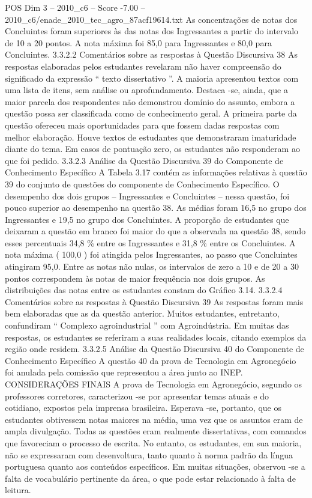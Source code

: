 \begin{textsample}{POS Dim 3 – 2010\_c6 – Score -7.00 – 2010\_c6/enade\_2010\_tec\_agro\_87acf19614.txt}
As concentrações de notas dos Concluintes foram superiores às das notas dos Ingressantes a partir do intervalo de 10 a 20 pontos.
A nota máxima foi 85,0 para Ingressantes e 80,0 para Concluintes. 3.3.2.2 Comentários sobre as respostas à Questão Discursiva 38 As respostas elaboradas pelos estudantes revelaram não haver compreensão do significado da expressão “ texto dissertativo ”.
A maioria apresentou textos com uma lista de itens, sem análise ou aprofundamento.
Destaca -se, ainda, que a maior parcela dos respondentes não demonstrou domínio do assunto, embora a questão possa ser classificada como de conhecimento geral.
A primeira parte da questão ofereceu mais oportunidades para que fossem dadas respostas com melhor elaboração.
Houve textos de estudantes que demonstraram imaturidade diante do tema.
Em casos de pontuação zero, os estudantes não responderam ao que foi pedido. 3.3.2.3 Análise da Questão Discursiva 39 do Componente de Conhecimento Específico A Tabela 3.17 contém as informações relativas à questão 39 do conjunto de questões do componente de Conhecimento Específico.
O desempenho dos dois grupos – Ingressantes e Concluintes – nessa questão, foi pouco superior ao desempenho na questão 38.
As médias foram 16,5 no grupo dos Ingressantes e 19,5 no grupo dos Concluintes.
A proporção de estudantes que deixaram a questão em branco foi maior do que a observada na questão 38, sendo esses percentuais 34,8 \% entre os Ingressantes e 31,8 \% entre os Concluintes.
A nota máxima ( 100,0 ) foi atingida pelos Ingressantes, ao passo que Concluintes atingiram 95,0.
Entre as notas não nulas, os intervalos de zero a 10 e de 20 a 30 pontos correspondem às notas de maior frequência nos dois grupos.
As distribuições das notas entre os estudantes constam do Gráfico 3.14. 3.3.2.4 Comentários sobre as respostas à Questão Discursiva 39 As respostas foram mais bem elaboradas que as da questão anterior.
Muitos estudantes, entretanto, confundiram “ Complexo agroindustrial ” com Agroindústria.
Em muitas das respostas, os estudantes se referiram a suas realidades locais, citando exemplos da região onde residem. 3.3.2.5 Análise da Questão Discursiva 40 do Componente de Conhecimento Específico A questão 40 da prova de Tecnologia em Agronegócio foi anulada pela comissão que representou a área junto ao INEP.
CONSIDERAÇÕES FINAIS A prova de Tecnologia em Agronegócio, segundo os professores corretores, caracterizou -se por apresentar temas atuais e do cotidiano, expostos pela imprensa brasileira.
Esperava -se, portanto, que os estudantes obtivessem notas maiores na média, uma vez que os assuntos eram de ampla divulgação.
Todas as questões eram realmente dissertativas, com comandos que favoreciam o processo de escrita.
No entanto, os estudantes, em sua maioria, não se expressaram com desenvoltura, tanto quanto à norma padrão da língua portuguesa quanto aos conteúdos específicos.
Em muitas situações, observou -se a falta de vocabulário pertinente da área, o que pode estar relacionado à falta de leitura.

\end{textsample}
